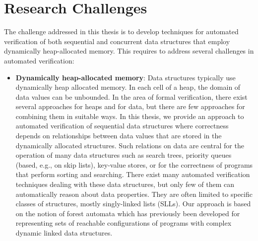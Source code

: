 \section{Research Challenges}
The challenge addressed in this thesis is to develop techniques for automated verification of both sequential and concurrent data structures that employ dynamically heap-allocated memory. This requires to address several challenges in automated verification:
\begin{itemize}
\item {\bf Dynamically heap-allocated memory}: Data structures typically use dynamically heap allocated memory. In each cell of a heap, the domain of data values can be unbounded.
   In the area of formal verification, there exist several approaches for heaps and for data, but there are few approaches for combining them in suitable ways. In this thesis, we provide an approach to automated verification of sequential data structures where correctness depends on relationships between data values that are stored in the dynamically allocated structures. Such relations on data are central for the operation of many data structures such as search trees, priority queues (based, e.g., on skip lists), key-value stores, or for the correctness of programs that perform sorting and searching. 
 There exist many automated verification techniques dealing with these data structures, but only few of them can automatically reason about data properties. They are often limited to specific classes of structures, mostly singly-linked lists (SLLs). Our approach is based on the notion of forest automata \cite{forester11} which has previously been developed for representing sets of reachable configurations of programs with complex dynamic linked data structures.


\end{itemize}
